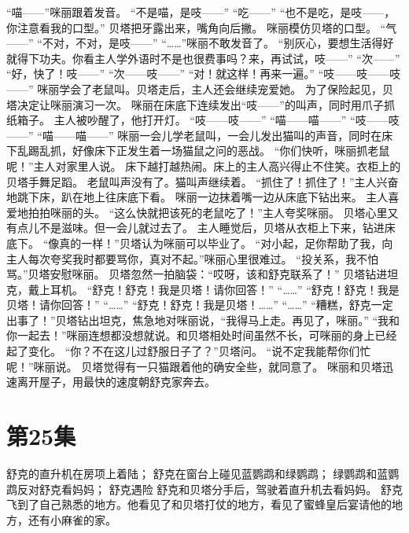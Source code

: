 \documentclass[a4paper,12pt,UTF8,twoside]{ctexbook}
\begin{document}
        “喵——”咪丽跟着发音。 
        “不是喵，是吱——” 
        “吃——” 
        “也不是吃，是吱——，你注意看我的口型。” 
        贝塔把牙露出来，嘴角向后撇。 
        咪丽模仿贝塔的口型。 
        “气——” 
        “不对，不对，是吱——” 
        “……”咪丽不敢发音了。 
        “别灰心，要想生活得好就得下功夫。你看主人学外语时不是也很费事吗？来，再试试，吱——” 
        “次——” 
        “好，快了！吱——” 
        “次——吱——” 
        “对！就这样！再来一遍。” 
        “吱——吱——吱——” 
        咪丽学会了老鼠叫。贝塔走后，主人还会继续宠爱她。 
        为了保险起见，贝塔决定让咪丽演习一次。 
        咪丽在床底下连续发出“吱——”的叫声，同时用爪子抓纸箱子。 
        主人被吵醒了，他打开灯。 
        “吱——吱——” 
        “喵——喵——” 
        “吱——吱——” 
        “喵——喵——” 
        咪丽一会儿学老鼠叫，一会儿发出猫叫的声音，同时在床下乱踢乱抓，好像床下正发生着一场猫鼠之问的恶战。 
        “你们快听，咪丽抓老鼠呢！”主人对家里人说。 
        床下越打越热闹。床上的主人高兴得止不住笑。衣柜上的贝塔手舞足蹈。 
        老鼠叫声没有了。猫叫声继续着。 
        “抓住了！抓住了！”主人兴奋地跳下床，趴在地上往床底下看。 
        咪丽一边抹着嘴一边从床底下钻出来。 
        主人喜爱地拍拍咪丽的头。 
        “这么快就把该死的老鼠吃了！”主人夸奖咪丽。 
        贝塔心里又有点儿不是滋味。但一会儿就过去了。 
        主人睡觉后，贝塔从衣柜上下来，钻进床底下。 
        “像真的一样！”贝塔认为咪丽可以毕业了。 
        “对小起，足你帮助了我，向主人每次夸奖我时都要骂你，真对不起。”咪丽心里很难过。 
        “投关系，我不怕骂。”贝塔安慰咪丽。 
        贝塔忽然一拍脑袋：“哎呀，该和舒克联系了！” 
        贝塔钻进坦克，戴上耳机。 
        “舒克！舒克！我是贝塔！请你回答！” 
        “……” 
        “舒克！舒克！我是贝塔！请你回答！” 
        “……” 
        “舒克！舒克！我是贝塔！……” 
        “……” 
        “糟糕，舒克一定出事了！”贝塔钻出坦克，焦急地对咪丽说，“我得马上走。再见了，咪丽。” 
        “我和你一起去！”咪丽连想都没想就说。和贝塔相处时间虽然不长，可咪丽的身上已经起了变化。 
        “你？不在这儿过舒服日子了？”贝塔问。 
        “说不定我能帮你们忙呢！”咪丽说。 
        贝塔觉得有一只猫跟着他的确安全些，就同意了。 
        咪丽和贝塔迅速离开屋子，用最快的速度朝舒克家奔去。   \chapter{第25集} 
        舒克的直升机在房项上着陆； 
        舒克在窗台上碰见蓝鹦鹉和绿鹦鹉； 
        绿鹦鹉和蓝鹦鹉反对舒克看妈妈； 
        舒克遇险   
        舒克和贝塔分手后，驾驶着直升机去看妈妈。 
        舒克飞到了自己熟悉的地方。他看见了和贝塔打仗的地方，看见了蜜蜂皇后宴请他的地方，还有小麻雀的家。 
\end{document}
